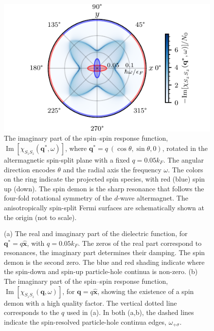 \documentclass[aps,prl,reprint,twocolumns,superscriptaddress]{revtex4-2}
\newenvironment{DIFnomarkup}{}{}
\DeclareMathOperator{\Imm}{Im}
\newcommand{\xx}{\hat{\bm{x}}}
\newcommand{\kF}{k_{F}}
\begin{document}
		
	\begin{DIFnomarkup}
		\begin{figure}
			\includegraphics[width=\columnwidth]{polar-plot-chiSzSz}
			\caption{The imaginary part of the spin–spin response function, $\Imm[\chi_{S_zS_z}(\bm q^*,\omega)]$, where $\bm q^*=q\ (\cos\theta,\sin\theta,0)$, rotated in the altermagnetic spin-split plane with a fixed $q=0.05\kF$. The angular direction encodes $\theta$ and the radial axis the frequency $\omega$. The colors on the ring indicate the projected spin species, with red (blue) spin up (down). The spin demon is the sharp resonance that follows the four-fold rotational symmetry of the $d$-wave altermagnet. The anisotropically spin-split Fermi surfaces are schematically shown at the origin (not to scale). \label{fig:polar}	}
		\end{figure}
		
		
		\begin{figure}
			\caption{(a) The real and imaginary part of the dielectric function, for $\bm q^* = q \hat{\bm x}$, with $q=0.05\kF$. The zeros of the real part correspond to resonances, the imaginary part determines their damping. The spin demon is the second zero. The blue and red shading indicate where the spin-down and spin-up particle-hole continua is non-zero. (b)  The imaginary part of the spin–spin response function, $\Imm[\chi_{S_zS_z}(\bm q,\omega)]$, for $\bm q=q\xx$, showing the existence of a spin demon with a high quality factor. The vertical dotted line corresponds to the $q$ used in (a). In both (a,b), the dashed lines indicate the spin-resolved particle-hole continua edges, $\omega_{+\sigma}$.\label{fig:alongx} }
		\end{figure}
	\end{DIFnomarkup}
	
\end{document}
